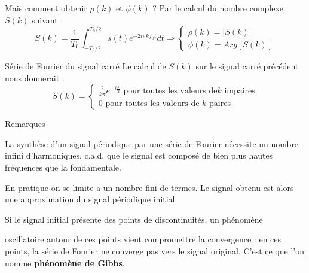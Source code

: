 \documentclass{beamer}
\begin{document}
\begin{frame}
\begin{alertblock}{Mais comment obtenir $\rho(k)$ et $\phi(k)$ ?}
\justifying Par le calcul du nombre complexe $S(k)$ suivant :
\[
S(k) = \frac{1}{T_0}\int_{-T_{0}/2}^{T_{0}/2}s(t)e^{-2i\pi k f_{0}t} dt
\Rightarrow
\begin{cases}
\rho(k) = \lvert S(k) \rvert\\
\phi(k) = Arg[S(k)]
\end{cases}
\]
\end{alertblock}
\pause
\begin{block}{Série de Fourier du signal carré}
\justifying Le calcul de $S(k)$ sur le signal carré précédent nous donnerait :
\[
S(k) =
\begin{cases}
 \frac{2}{k\pi}e^{-i\frac{\pi}{2}}\text{ pour toutes les valeurs de
}k\text{ impaires}\\
0\text{ pour toutes les valeurs de }k\text{ paires}
\end{cases}
\]
\end{block}
\end{frame} 

\begin{frame}
\begin{alertblock}{Remarques}
\itemize \justifying
\item La synthèse d'un signal périodique par une série de Fourier
nécessite un nombre infini d'harmoniques, c.a.d. que
le signal est composé de bien plus hautes fréquences que la
fondamentale.
\pause
\item En pratique on se limite a un nombre fini de termes. Le signal
obtenu est alors une approximation du signal périodique initial.
\pause
\item Si le signal initial présente des points de discontinuités, un phénomène

oscillatoire autour de ces points vient compromettre la convergence : en ces
points, la série de Fourier ne converge pas vers le signal original. C'est ce
que l'on nomme \textbf{phénomène de Gibbs}.
\end{alertblock}
\end{frame}
\end{document}
